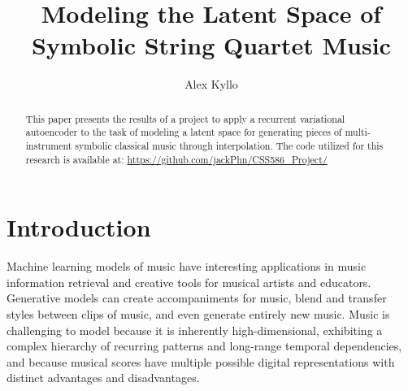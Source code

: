 \documentclass[sigconf,authorversion]{acmart}
\begin{document}
\renewcommand\footnotetextcopyrightpermission[1]{}
\pagestyle{plain}
\title{Modeling the Latent Space of Symbolic String Quartet Music}


\author{Alex Kyllo}

\begin{abstract}
  This paper presents the results of a project to apply a recurrent
  variational autoencoder to the task of modeling a latent space for
  generating pieces of multi-instrument symbolic classical music
  through interpolation. The code utilized for this research is available at:
  \url{https://github.com/jackPhn/CSS586_Project/}
\end{abstract}


\maketitle

\section{Introduction}

Machine learning models of music have interesting applications in
music information retrieval and creative tools for musical artists and
educators. Generative models can create accompaniments for music,
blend and transfer styles between clips of music, and even generate
entirely new music. Music is challenging to model because it is
inherently high-dimensional, exhibiting a complex hierarchy of
recurring patterns and long-range temporal dependencies, and because
musical scores have multiple possible digital representations with
distinct advantages and disadvantages.
\end{document}
